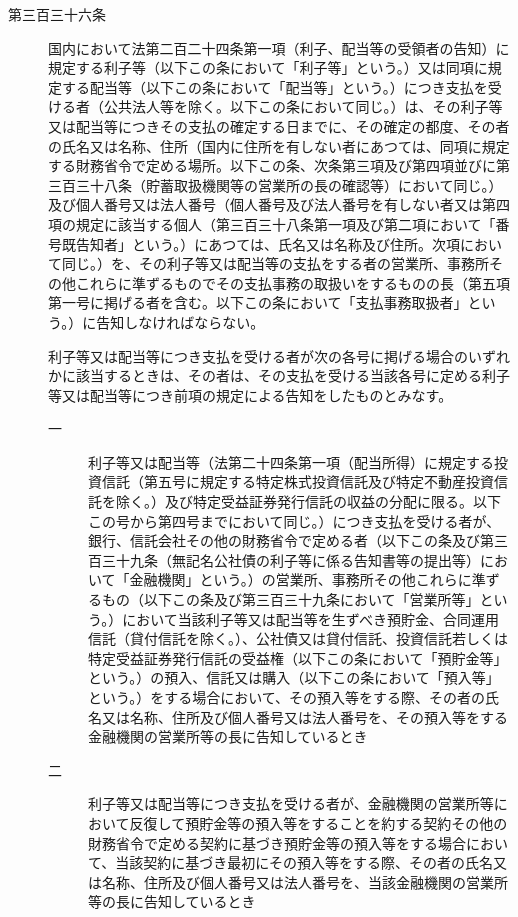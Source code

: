 \documentclass[twocolumn,a4j,10pt]{ltjtarticle}
\begin{document}
\begin{description}
\item[第三百三十六条]国内において法第二百二十四条第一項（利子、配当等の受領者の告知）に規定する利子等（以下この条において「利子等」という。）又は同項に規定する配当等（以下この条において「配当等」という。）につき支払を受ける者（公共法人等を除く。以下この条において同じ。）は、その利子等又は配当等につきその支払の確定する日までに、その確定の都度、その者の氏名又は名称、住所（国内に住所を有しない者にあつては、同項に規定する財務省令で定める場所。以下この条、次条第三項及び第四項並びに第三百三十八条（貯蓄取扱機関等の営業所の長の確認等）において同じ。）及び個人番号又は法人番号（個人番号及び法人番号を有しない者又は第四項の規定に該当する個人（第三百三十八条第一項及び第二項において「番号既告知者」という。）にあつては、氏名又は名称及び住所。次項において同じ。）を、その利子等又は配当等の支払をする者の営業所、事務所その他これらに準ずるものでその支払事務の取扱いをするものの長（第五項第一号に掲げる者を含む。以下この条において「支払事務取扱者」という。）に告知しなければならない。
\item[]利子等又は配当等につき支払を受ける者が次の各号に掲げる場合のいずれかに該当するときは、その者は、その支払を受ける当該各号に定める利子等又は配当等につき前項の規定による告知をしたものとみなす。
\begin{description}
\item[一]利子等又は配当等（法第二十四条第一項（配当所得）に規定する投資信託（第五号に規定する特定株式投資信託及び特定不動産投資信託を除く。）及び特定受益証券発行信託の収益の分配に限る。以下この号から第四号までにおいて同じ。）につき支払を受ける者が、銀行、信託会社その他の財務省令で定める者（以下この条及び第三百三十九条（無記名公社債の利子等に係る告知書等の提出等）において「金融機関」という。）の営業所、事務所その他これらに準ずるもの（以下この条及び第三百三十九条において「営業所等」という。）において当該利子等又は配当等を生ずべき預貯金、合同運用信託（貸付信託を除く。）、公社債又は貸付信託、投資信託若しくは特定受益証券発行信託の受益権（以下この条において「預貯金等」という。）の預入、信託又は購入（以下この条において「預入等」という。）をする場合において、その預入等をする際、その者の氏名又は名称、住所及び個人番号又は法人番号を、その預入等をする金融機関の営業所等の長に告知しているとき
\item[二]利子等又は配当等につき支払を受ける者が、金融機関の営業所等において反復して預貯金等の預入等をすることを約する契約その他の財務省令で定める契約に基づき預貯金等の預入等をする場合において、当該契約に基づき最初にその預入等をする際、その者の氏名又は名称、住所及び個人番号又は法人番号を、当該金融機関の営業所等の長に告知しているとき

\end{description}
\end{description}
\end{document}
